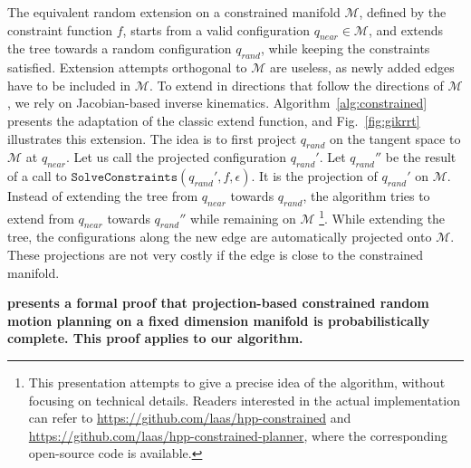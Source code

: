\documentclass{article}
\newcommand\manifold{\mathcal{M}}
\begin{document}
The equivalent random extension on a constrained manifold $\manifold$,
defined by the constraint function $f$, starts from a valid
configuration $q_{near} \in \manifold$, and extends the tree towards a
random configuration $q_{rand}$, while keeping the constraints
satisfied. Extension attempts orthogonal to $\manifold$ are useless,
as newly added edges have to be included in $\manifold$. To extend in
directions that follow the directions of $\manifold$, we rely on
Jacobian-based inverse kinematics. Algorithm~\ref{alg:constrained}
presents the adaptation of the classic extend function, and
Fig.~\ref{fig:gikrrt} illustrates this extension. The idea is to first
project $q_{rand}$ on the tangent space to $\manifold$ at
$q_{near}$. Let us call the projected configuration $q_{rand}'$. Let
$q_{rand}''$ be the result of a call to
$\texttt{SolveConstraints}(q_{rand}',f,\epsilon)$.  It is the
projection of $q_{rand}'$ on $\manifold$. Instead of extending the
tree from $q_{near}$ towards $q_{rand}$, the algorithm tries to extend
from $q_{near}$ towards $q_{rand}''$ while remaining on
$\manifold$ \footnote{This presentation attempts to give a precise
  idea of the algorithm, without focusing on technical
  details. Readers interested in the actual implementation can refer
  to \url{https://github.com/laas/hpp-constrained} and
  \url{https://github.com/laas/hpp-constrained-planner}, where the
  corresponding open-source code is available.}. While extending the
tree, the configurations along the new edge are automatically
projected onto $\manifold$. These projections are not very costly if
the edge is close to the constrained manifold. 

{\bf \cite{berenson2011task} presents a formal proof that projection-based 
constrained random motion planning on a fixed dimension manifold is 
probabilistically complete. This proof applies to our algorithm. }
\end{document}
